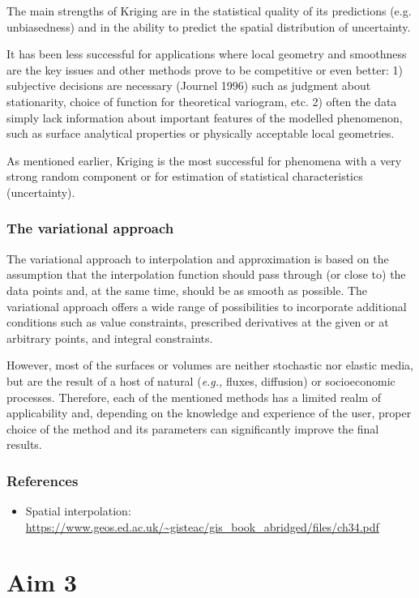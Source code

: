 \documentclass{article}
\begin{document}
The main strengths of Kriging are in the statistical quality of its predictions (e.g. unbiasedness) and in the ability to predict the spatial distribution of uncertainty. 

It has been less successful for applications where local geometry and smoothness are the key issues and other methods prove to be competitive or even better: 1) subjective decisions are necessary (Journel 1996) such as judgment about stationarity, choice of function for theoretical variogram, etc. 2) often the data simply lack information about important features of the modelled phenomenon, such as surface analytical properties or physically acceptable local geometries. 

As mentioned earlier, Kriging is the most successful for phenomena with a very strong random component or for estimation of statistical characteristics (uncertainty).

\subsubsection{The variational approach}
The variational approach to interpolation and approximation is based on the assumption that the interpolation function should pass through (or close to) the data points and, at the same time, should be as smooth as possible. The variational approach offers a wide range of possibilities to incorporate additional conditions such as value constraints, prescribed derivatives at the given or at arbitrary points, and integral constraints.

However, most of the surfaces or volumes are neither stochastic nor elastic media, but are the result of a host of natural (\textit{e.g.,} fluxes, diffusion) or socioeconomic processes. Therefore, each of the mentioned methods has a limited realm of applicability and, depending on the knowledge and experience of the user, proper choice of the method and its parameters can significantly improve the final results. 

\subsubsection*{References}
\begin{itemize}
    \item Spatial interpolation: \url{https://www.geos.ed.ac.uk/~gisteac/gis_book_abridged/files/ch34.pdf}
\end{itemize}

\section{Aim 3}
\end{document}
